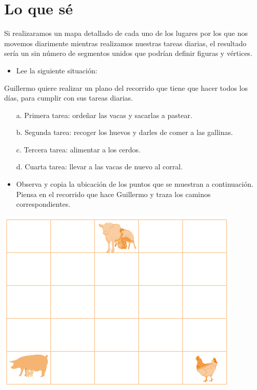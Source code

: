 \documentclass[twoside]{article}
\begin{document}
 \section*{Lo que s\'e}
 Si realizaramos un mapa detallado de cada uno de los lugares por
los que nos movemos diarimente mientras realizamos nuestras
tareas diarias, el resultado sería un sin número de segmentos
unidos que podrían definir figuras y vértices.
\begin{itemize}
\item Lee la siguiente situación:
\end{itemize}
Guillermo quiere realizar un plano del recorrido que tiene
que hacer todos los días, para cumplir con sus tareas diarias.
\begin{enumerate}
\item[a.] Primera tarea: ordeñar las vacas y sacarlas a pastear.
\item[b.] Segunda tarea: recoger los huevos y darles de comer a las gallinas.
\item[c.] Tercera tarea: alimentar a los cerdos.
\item[d.] Cuarta tarea: llevar a las vacas de nuevo al corral.
\end{enumerate}
\begin{itemize}
\item Observa y copia la ubicación de los puntos que se muestran a
continuación. Piensa en el recorrido que hace Guillermo y traza
los caminos correspondientes.
\end{itemize}
\begin{center}
\includegraphics[scale=.55]{Images/animales_domesticos.png}
\end{center}
\end{document}
